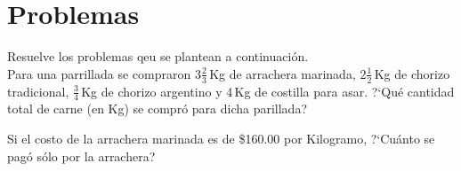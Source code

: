 \documentclass[11pt]{article}
\begin{document}
\section{Problemas}

Resuelve los problemas qeu se plantean a continuaci\'on. \\


Para una parrillada se compraron $3\frac{2}{3} $\,Kg de arrachera  marinada,
$2\frac{1}{2} $\,Kg de chorizo tradicional, $\frac{3}{4} $\,Kg de chorizo
argentino y 4\,Kg de costilla para asar. ?`Qu\'e cantidad total de carne (en Kg)
se compr\'o para dicha parillada?

\vspace{3cm}


Si el costo de la arrachera marinada es de \$160.00 por Kilogramo, ?`Cu\'anto se
pag\'o s\'olo por la arrachera?
\end{document}

